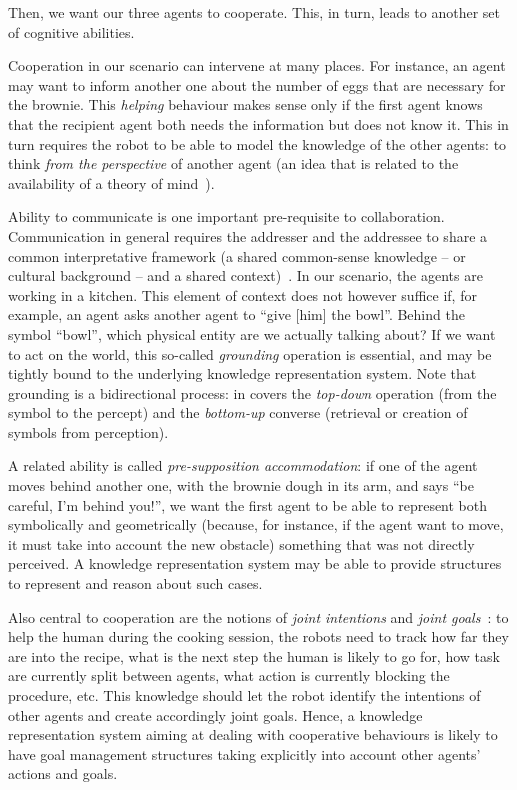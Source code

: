 \documentclass[a4paper, twocolumn]{article}
\begin{document}
Then, we want our three agents to cooperate. This, in turn, leads to another
set of cognitive abilities.

Cooperation in our scenario can intervene at many places. For instance, an
agent may want to inform another one about the number of eggs that are
necessary for the brownie. This \emph{helping} behaviour makes sense only if
the first agent knows that the recipient agent both needs the information but
does not know it. This in turn requires the robot to be able to model the
knowledge of the other agents: to think \emph{from the perspective} of another
agent (an idea that is related to the availability of a theory of
mind~\cite{Leslie2000}).

Ability to communicate is one important pre-requisite to collaboration.
Communication in general requires the addresser and the addressee to share a
common interpretative framework (a shared common-sense knowledge -- or cultural
background -- and a shared context)~\cite{Jakobson1960}. In our scenario, the
agents are working in a kitchen. This element of context does not however
suffice if, for example, an agent asks another agent to ``give {[him]} the
bowl''. Behind the symbol ``bowl'', which physical entity are we actually
talking about? If we want to act on the world, this so-called \emph{grounding}
operation is essential, and may be tightly bound to the underlying knowledge
representation system. Note that grounding is a bidirectional process: in
covers the {\it top-down} operation (from the symbol to the percept) and the
{\it bottom-up} converse (retrieval or creation of symbols from perception).

A related ability is called \emph{pre-supposition accommodation}: if one of the
agent moves behind another one, with the brownie dough in its arm, and says
``be careful, I'm behind you!'', we want the first agent to be able to
represent both symbolically and geometrically (because, for instance, if the
agent want to move, it must take into account the new obstacle) something that
was not directly perceived. A knowledge representation system may be able to
provide structures to represent and reason about such cases.

Also central to cooperation are the notions of \emph{joint
intentions} and \emph{joint goals}~\cite{Tomasello2005, Bratman2009}: to help
the human during the cooking session, the robots need to track how far
they are into the recipe, what is the next step the human is likely to go for,
how task are currently split between agents, what action is currently
blocking the procedure, etc. This knowledge should let the robot identify the
intentions of other agents and create accordingly joint goals. Hence, a
knowledge representation system aiming at dealing with cooperative behaviours
is likely to have goal management structures taking explicitly into account
other agents' actions and goals.
\end{document}
